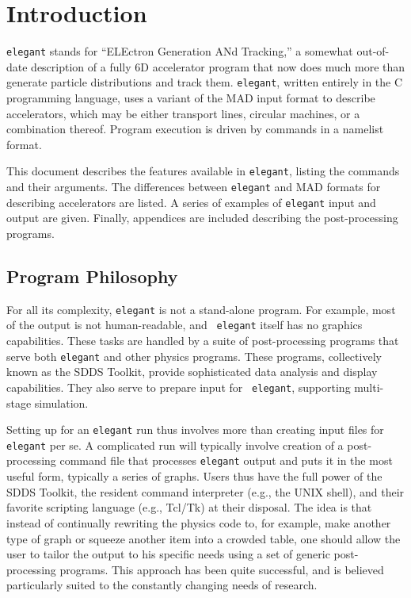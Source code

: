 \documentclass[11pt]{article}
\begin{document}
\section{Introduction}

{\tt elegant} stands for ``ELEctron Generation ANd Tracking,'' a
somewhat out-of-date description of a fully 6D accelerator program
that now does much more than generate particle distributions and track
them.  {\tt elegant}, written entirely in the C programming
language\cite{Kernighan}, uses a variant of the MAD\cite{MAD} input
format to describe accelerators, which may be either transport lines,
circular machines, or a combination thereof.  Program execution is
driven by commands in a namelist format.

This document describes the features available in {\tt elegant},
listing the commands and their arguments.  The differences between
{\tt elegant} and MAD formats for describing accelerators are listed.
A series of examples of {\tt elegant} input and output are given.
Finally, appendices are included describing the post-processing
programs.

\subsection{Program Philosophy}

For all its complexity, {\tt elegant} is not a stand-alone program.
For example, most of the output is not human-readable, and {\tt
elegant} itself has no graphics capabilities.  These tasks are handled
by a suite of post-processing programs that serve both {\tt elegant}
and other physics programs.  These programs, collectively known as the
SDDS Toolkit\cite{SDDS1,SDDS2}, provide sophisticated data analysis
and display capabilities.  They also serve to prepare input for {\tt
elegant}, supporting multi-stage simulation.

Setting up for an {\tt elegant} run thus involves more than creating
input files for {\tt elegant} per se.  A complicated run will
typically involve creation of a post-processing command file that
processes {\tt elegant} output and puts it in the most useful form,
typically a series of graphs.  Users thus have the full power of the
SDDS Toolkit, the resident command interpreter (e.g., the UNIX shell),
and their favorite scripting language (e.g., Tcl/Tk) at their
disposal. The idea is that instead of continually rewriting the
physics code to, for example, make another type of graph or squeeze
another item into a crowded table, one should allow the user to tailor
the output to his specific needs using a set of generic
post-processing programs.  This approach has been quite successful,
and is believed particularly suited to the constantly changing needs
of research.
\end{document}
